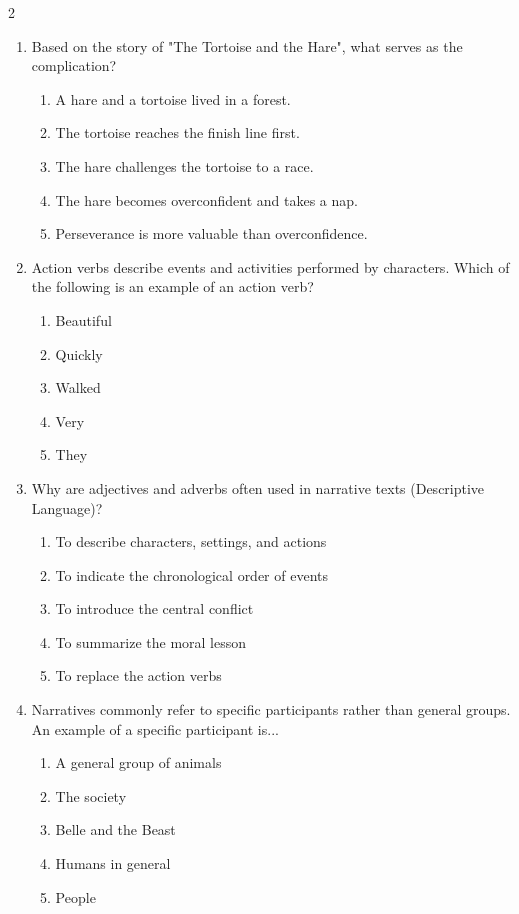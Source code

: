 \documentclass[10pt,a4paper]{article}
\begin{document}
\begin{multicols}{2}
\begin{enumerate}
    \item Based on the story of "The Tortoise and the Hare", what serves as the complication?
    \begin{enumerate}
      \item A hare and a tortoise lived in a forest.
      \item The tortoise reaches the finish line first.
      \item The hare challenges the tortoise to a race.
      \item The hare becomes overconfident and takes a nap.
      \item Perseverance is more valuable than overconfidence.
    \end{enumerate}

    \item Action verbs describe events and activities performed by characters. Which of the following is an example of an action verb?
    \begin{enumerate}
      \item Beautiful
      \item Quickly
      \item Walked
      \item Very
      \item They
    \end{enumerate}

    \item Why are adjectives and adverbs often used in narrative texts (Descriptive Language)?
    \begin{enumerate}
      \item To describe characters, settings, and actions
      \item To indicate the chronological order of events
      \item To introduce the central conflict
      \item To summarize the moral lesson
      \item To replace the action verbs
    \end{enumerate}

    \item Narratives commonly refer to specific participants rather than general groups. An example of a specific participant is...
    \begin{enumerate}
      \item A general group of animals
      \item The society
      \item Belle and the Beast
      \item Humans in general
      \item People
    \end{enumerate}


\end{enumerate}
\end{multicols}
\end{document}
